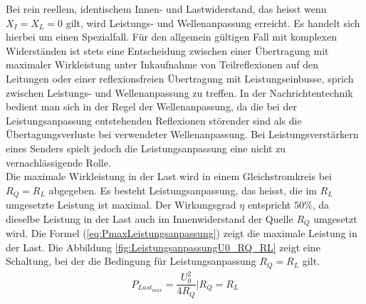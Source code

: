 Bei rein reellem, identischem Innen- und Lastwiderstand, das heisst wenn $X_I = X_L = 0$ gilt, wird Leistungs- und Wellenanpassung erreicht. Es handelt sich hierbei um einen Spezialfall. Für den allgemein gültigen Fall mit komplexen Widerständen ist stets eine Entscheidung zwischen einer Übertragung mit maximaler Wirkleistung unter Inkaufnahme von Teilreflexionen auf den Leitungen oder einer reflexionsfreien Übertragung mit Leistungseinbusse, sprich zwischen Leistungs- und Wellenanpassung zu treffen. In der Nachrichtentechnik bedient man sich in der Regel der Wellenanpassung, da die bei der Leistungsanpassung entstehenden Reflexionen störender sind als die Übertagungsverluste bei verwendeter Wellenanpassung. Bei Leistungsverstärkern eines Senders spielt jedoch die Leistungsanpassung eine nicht zu vernachlässigende Rolle. \\

Die maximale Wirkleistung in der Last wird in einem Gleichstromkreis bei $R_Q = R_L$ abgegeben. Es besteht Leistungsanpassung, das heisst, die im $R_L$ umgesetzte Leistung ist maximal. Der Wirkungsgrad $\eta$ entspricht $50\%$, da dieselbe Leistung in der Last auch im Innenwiderstand der Quelle $R_Q$ umgesetzt wird. Die Formel (\ref{eq:PmaxLeistungsanpassung}) zeigt die maximale Leistung in der Last. Die Abbildung \ref{fig:LeistungsanpassungU0_RQ_RL} zeigt eine Schaltung, bei der die Bedingung für Leistungsanpassung $R_Q = R_L$ gilt.
\begin{eqnarray}\label{eq:PmaxLeistungsanpassung}
P_{Last_{max}}=\dfrac{U_{0}^2}{4R_Q} | R_Q=R_L
\end{eqnarray}

